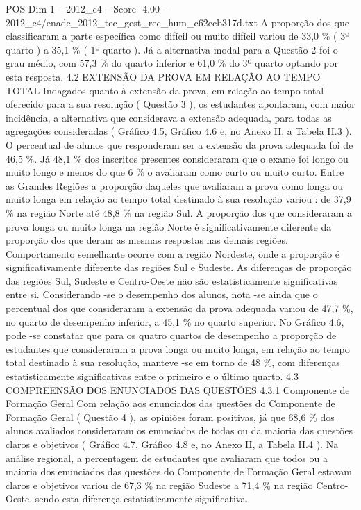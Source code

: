 \begin{textsample}{POS Dim 1 – 2012\_c4 – Score -4.00 – 2012\_c4/enade\_2012\_tec\_gest\_rec\_hum\_c62ecb317d.txt}
A proporção dos que classificaram a parte específica como difícil ou muito difícil variou de 33,0 \% ( 3º quarto ) a 35,1 \% ( 1º quarto ).
Já a alternativa modal para a Questão 2 foi o grau médio, com 57,3 \% do quarto inferior e 61,0 \% do 3º quarto optando por esta resposta. 4.2 EXTENSÃO DA PROVA EM RELAÇÃO AO TEMPO TOTAL Indagados quanto à extensão da prova, em relação ao tempo total oferecido para a sua resolução ( Questão 3 ), os estudantes apontaram, com maior incidência, a alternativa que considerava a extensão adequada, para todas as agregações consideradas ( Gráfico 4.5, Gráfico 4.6 e, no Anexo II, a Tabela II.3 ).
O percentual de alunos que responderam ser a extensão da prova adequada foi de 46,5 \%.
Já 48,1 \% dos inscritos presentes consideraram que o exame foi longo ou muito longo e menos do que 6 \% o avaliaram como curto ou muito curto.
Entre as Grandes Regiões a proporção daqueles que avaliaram a prova como longa ou muito longa em relação ao tempo total destinado à sua resolução variou : de 37,9 \% na região Norte até 48,8 \% na região Sul.
A proporção dos que consideraram a prova longa ou muito longa na região Norte é significativamente diferente da proporção dos que deram as mesmas respostas nas demais regiões.
Comportamento semelhante ocorre com a região Nordeste, onde a proporção é significativamente diferente das regiões Sul e Sudeste.
As diferenças de proporção das regiões Sul, Sudeste e Centro-Oeste não são estatisticamente significativas entre si.
Considerando -se o desempenho dos alunos, nota -se ainda que o percentual dos que consideraram a extensão da prova adequada variou de 47,7 \%, no quarto de desempenho inferior, a 45,1 \% no quarto superior.
No Gráfico 4.6, pode -se constatar que para os quatro quartos de desempenho a proporção de estudantes que consideraram a prova longa ou muito longa, em relação ao tempo total destinado à sua resolução, manteve -se em torno de 48 \%, com diferenças estatisticamente significativas entre o primeiro e o último quarto. 4.3 COMPREENSÃO DOS ENUNCIADOS DAS QUESTÕES 4.3.1 Componente de Formação Geral Com relação aos enunciados das questões do Componente de Formação Geral ( Questão 4 ), as opiniões foram positivas, já que 68,6 \% dos alunos avaliados consideraram os enunciados de todas ou da maioria das questões claros e objetivos ( Gráfico 4.7, Gráfico 4.8 e, no Anexo II, a Tabela II.4 ).
Na análise regional, a percentagem de estudantes que avaliaram que todos ou a maioria dos enunciados das questões do Componente de Formação Geral estavam claros e objetivos variou de 67,3 \% na região Sudeste a 71,4 \% na região Centro-Oeste, sendo esta diferença estatisticamente significativa.

\end{textsample}
